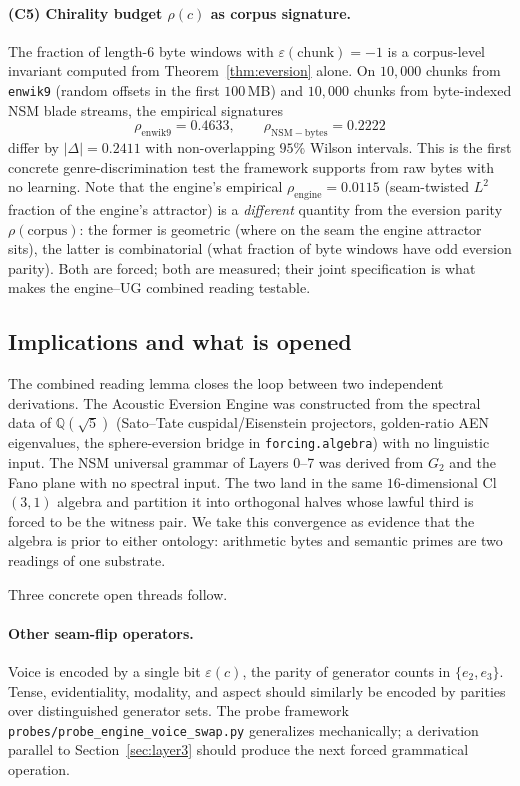 \documentclass[11pt,a4paper]{article}
\theoremstyle{plain}
\theoremstyle{definition}
\theoremstyle{remark}
\numberwithin{equation}{section}
\providecommand{\eps}{\varepsilon}
\begin{document}
\paragraph{(C5) Chirality budget $\rho(c)$ as corpus signature.}
The fraction of length-6 byte windows with $\eps(\text{chunk}) =
-1$ is a corpus-level invariant computed from
Theorem~\ref{thm:eversion} alone.  On $10{,}000$ chunks from
\texttt{enwik9} (random offsets in the first $100\,$MB) and
$10{,}000$ chunks from byte-indexed NSM blade streams, the
empirical signatures
\[
  \rho_{\mathrm{enwik9}} = 0.4633,
  \qquad
  \rho_{\mathrm{NSM-bytes}} = 0.2222
\]
differ by $|\Delta| = 0.2411$ with non-overlapping $95\%$
Wilson intervals.  This is the first concrete genre-discrimination
test the framework supports from raw bytes with no learning.  Note
that the engine's empirical $\rho_{\mathrm{engine}} = 0.0115$
(seam-twisted $L^2$ fraction of the engine's attractor) is a
\emph{different} quantity from the eversion parity
$\rho(\mathrm{corpus})$: the former is geometric (where on the seam
the engine attractor sits), the latter is combinatorial (what
fraction of byte windows have odd eversion parity).  Both are
forced; both are measured; their joint specification is what
makes the engine--UG combined reading testable.

\subsection{Implications and what is opened}\label{sec:open}

The combined reading lemma closes the loop between two
independent derivations.  The Acoustic Eversion Engine was
constructed from the spectral data of $\mathbb{Q}(\sqrt{5})$
(Sato--Tate cuspidal/Eisenstein projectors, golden-ratio AEN
eigenvalues, the sphere-eversion bridge in
\texttt{forcing.algebra}) with no linguistic input.  The NSM
universal grammar of Layers 0--7 was derived from $G_2$ and the
Fano plane with no spectral input.  The two land in the same
$16$-dimensional Cl$(3,1)$ algebra and partition it into
orthogonal halves whose lawful third is forced to be the witness
pair.  We take this convergence as evidence that the algebra is
prior to either ontology: arithmetic bytes and semantic primes are
two readings of one substrate.

Three concrete open threads follow.

\paragraph{Other seam-flip operators.}
Voice is encoded by a single bit $\eps(c)$, the parity of generator
counts in $\{e_2, e_3\}$.  Tense, evidentiality, modality, and
aspect should similarly be encoded by parities over distinguished
generator sets.  The probe framework
\texttt{probes/probe\_engine\_voice\_swap.py} generalizes
mechanically; a derivation parallel to Section~\ref{sec:layer3}
should produce the next forced grammatical operation.
\end{document}
